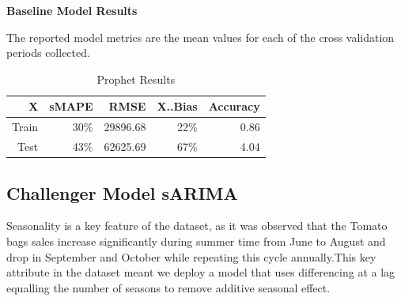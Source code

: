 \documentclass[12pt,oneside]{chicagocapstone}
\begin{document}
\textbf{Baseline Model Results}

The reported model metrics are the mean values for each of the cross
validation periods collected.
\begin{longtable}{r|r|r|r|r}
\caption{\label{tab:prophetresults}Prophet Results}\\
\hline
X & sMAPE & RMSE & X..Bias & Accuracy\\
\hline
Train & 30\% & 29896.68 & 22\% & 0.86\\
\hline
Test & 43\% & 62625.69 & 67\% & 4.04\\
\hline
\end{longtable}
\subsection*{Challenger Model sARIMA}\label{findings-sARIMA}

Seasonality is a key feature of the dataset, as it was observed that the
Tomato bags sales increase significantly during summer time from June to
August and drop in September and October while repeating this cycle
annually.This key attribute in the dataset meant we deploy a model that
uses differencing at a lag equalling the number of seasons to remove
additive seasonal effect.
\end{document}

